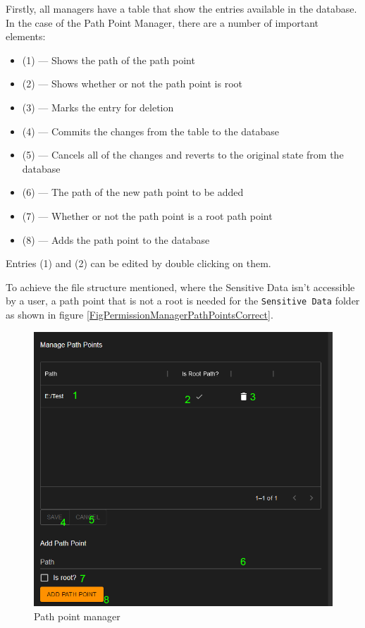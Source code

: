 Firstly, all managers have a table that show the entries available in the database. In the case of the Path Point Manager, there are a number of important elements:
\begin{itemize}
	\item (1) --- Shows the path of the path point
	\item (2) --- Shows whether or not the path point is root
	\item (3) --- Marks the entry for deletion
	\item (4) --- Commits the changes from the table to the database
	\item (5) --- Cancels all of the changes and reverts to the original state from the database
	\item (6) --- The path of the new path point to be added
	\item (7) --- Whether or not the path point is a root path point
	\item (8) --- Adds the path point to the database
\end{itemize}

Entries (1) and (2) can be edited by double clicking on them.

To achieve the file structure mentioned, where the Sensitive Data isn't accessible by a user, a path point that is not a root is needed for the \verb|Sensitive Data| folder as shown in figure \ref{FigPermissionManagerPathPointsCorrect}.

\begin{figure}[htbp]
	\centering
		\includegraphics[scale=0.5]{./figures/chapter4/permission_manager_path_points.png}
	\caption{Path point manager}
	\label{FigPermissionManagerPathPoints}
\end{figure}


